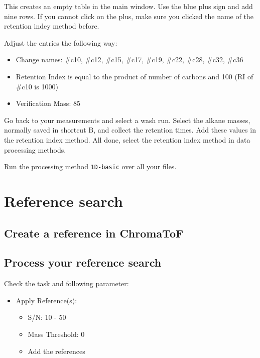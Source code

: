 \documentclass[]{book}
\providecommand{\tightlist}{%
  \setlength{\itemsep}{0pt}\setlength{\parskip}{0pt}}
\begin{document}
This creates an empty table in the main window. Use the blue plus sign and add nine rows. If you cannot click on the plus, make sure you clicked the name of the retention indey method before.

Adjust the entries the following way:

\begin{itemize}
\tightlist
\item
  Change names: \#c10, \#c12, \#c15, \#c17, \#c19, \#c22, \#c28, \#c32, \#c36
\item
  Retention Index is equal to the product of number of carbons and 100 (RI of \#c10 is 1000)
\item
  Verification Mass: 85
\end{itemize}

Go back to your measurements and select a wash run. Select the alkane masses, normally saved in shortcut B, and collect the retention times. Add these values in the retention index method.
All done, select the retention index method in data processing methods.

Run the processing method \texttt{1D-basic} over all your files.

\hypertarget{reference-search}{%
\section{Reference search}\label{reference-search}}

\hypertarget{create-a-reference-in-chromatof}{%
\subsection{Create a reference in ChromaToF}\label{create-a-reference-in-chromatof}}

\hypertarget{process-your-reference-search}{%
\subsection{Process your reference search}\label{process-your-reference-search}}

Check the task and following parameter:

\begin{itemize}
\item
  Apply Reference(s):

  \begin{itemize}
  \tightlist
  \item
    S/N: 10 - 50
  \item
    Mass Threshold: 0
  \item
    Add the references
  \end{itemize}
\end{itemize}
\end{document}
